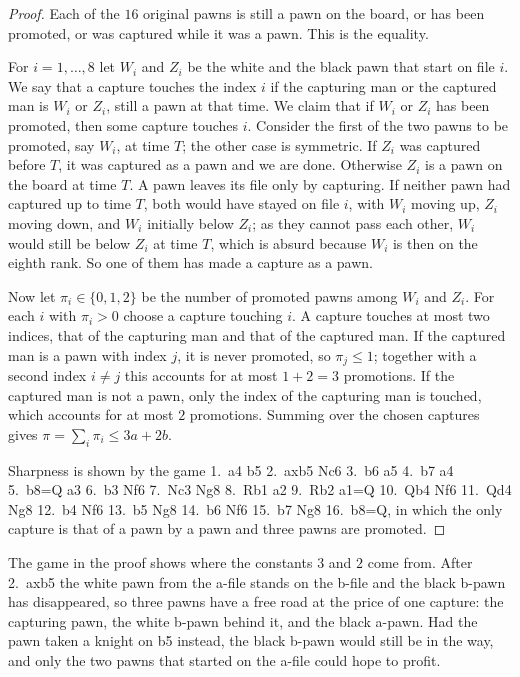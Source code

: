 \documentclass[12pt,reqno]{article}
\begin{document}
\begin{proof}
Each of the $16$ original pawns is still a pawn on the board, or has been promoted, or was
captured while it was a pawn. This is the equality.

For $i=1,\ldots,8$ let $W_i$ and $Z_i$ be the white and the black pawn that start on file $i$. We
say that a capture touches the index $i$ if the capturing man or the captured man is
$W_i$ or $Z_i$, still a pawn at that time. We claim that if $W_i$ or $Z_i$ has been promoted,
then some capture touches $i$. Consider the first of the two pawns to be promoted, say $W_i$,
at time $T$; the other case is symmetric. If $Z_i$ was captured before $T$, it was captured as
a pawn and we are done. Otherwise $Z_i$ is a pawn on the board at time $T$. A pawn leaves its
file only by capturing. If neither pawn had captured up to time $T$, both would have stayed
on file $i$, with $W_i$ moving up, $Z_i$ moving down, and $W_i$ initially below $Z_i$; as they
cannot pass each other, $W_i$ would still be below $Z_i$ at time $T$, which is absurd because
$W_i$ is then on the eighth rank. So one of them has made a capture as a pawn.

Now let $\pi_i\in\{0,1,2\}$ be the number of promoted pawns among $W_i$ and $Z_i$. For
each $i$ with $\pi_i>0$ choose a capture touching $i$. A capture touches at most two indices,
that of the capturing man and that of the captured man. If the captured man is a pawn with
index $j$, it is never promoted, so $\pi_j\leq 1$; together with a second index $i\neq j$ this
accounts for at most $1+2=3$ promotions. If the captured man is not a pawn, only the index
of the capturing man is touched, which accounts for at most $2$ promotions. Summing over
the chosen captures gives $\pi=\sum_i\pi_i\leq 3a+2b$.

Sharpness is shown by the game
1.\ a4 b5 2.\ axb5 Nc6 3.\ b6 a5 4.\ b7 a4 5.\ b8=Q a3 6.\ b3 Nf6 7.\ Nc3 Ng8 8.\ Rb1 a2
9.\ Rb2 a1=Q 10.\ Qb4 Nf6 11.\ Qd4 Ng8 12.\ b4 Nf6 13.\ b5 Ng8 14.\ b6 Nf6 15.\ b7 Ng8
16.\ b8=Q, in which the only capture is that of a pawn by a pawn and three pawns are
promoted.
\end{proof}

The game in the proof shows where the constants $3$ and $2$ come from. After 2.\ axb5 the
white pawn from the a-file stands on the b-file and the black b-pawn has disappeared, so three
pawns have a free road at the price of one capture: the capturing pawn, the white b-pawn behind
it, and the black a-pawn. Had the pawn taken a knight on b5 instead, the black b-pawn would
still be in the way, and only the two pawns that started on the a-file could hope to profit.
\end{document}
